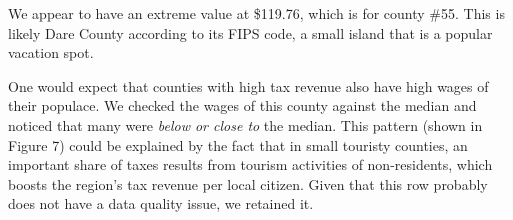 \documentclass[]{article}
\newenvironment{Shaded}{\begin{snugshade}}{\end{snugshade}}
\newcommand{\CommentTok}[1]{\textcolor[rgb]{0.56,0.35,0.01}{\textit{#1}}}
\newcommand{\DataTypeTok}[1]{\textcolor[rgb]{0.13,0.29,0.53}{#1}}
\newcommand{\DecValTok}[1]{\textcolor[rgb]{0.00,0.00,0.81}{#1}}
\newcommand{\FloatTok}[1]{\textcolor[rgb]{0.00,0.00,0.81}{#1}}
\newcommand{\KeywordTok}[1]{\textcolor[rgb]{0.13,0.29,0.53}{\textbf{#1}}}
\newcommand{\NormalTok}[1]{#1}
\newcommand{\OperatorTok}[1]{\textcolor[rgb]{0.81,0.36,0.00}{\textbf{#1}}}
\newcommand{\StringTok}[1]{\textcolor[rgb]{0.31,0.60,0.02}{#1}}
\begin{document}
We appear to have an extreme value at \$119.76, which is for county
\#55. This is likely Dare County according to its FIPS code, a small
island that is a popular vacation spot.

One would expect that counties with high tax revenue also have high
wages of their populace. We checked the wages of this county against the
median and noticed that many were \emph{below or close to} the median.
This pattern (shown in Figure 7) could be explained by the fact that in
small touristy counties, an important share of taxes results from
tourism activities of non-residents, which boosts the region's tax
revenue per local citizen. Given that this row probably does not have a
data quality issue, we retained it.

\begin{Shaded}
\end{Shaded}
\end{document}

